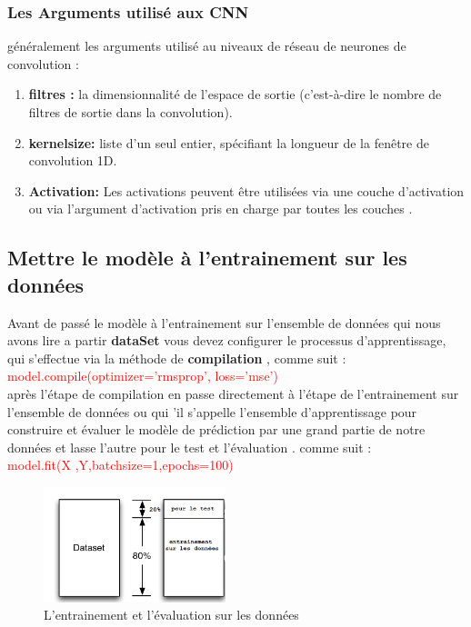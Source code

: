 \documentclass[12pt]{report}
\begin{document}
\subsubsection{Les Arguments utilisé aux CNN}
généralement les arguments utilisé au niveaux de réseau de neurones de convolution :
\begin{enumerate}
\item \textbf{filtres :} la dimensionnalité de l'espace de sortie (c'est-à-dire le nombre de filtres de sortie dans la convolution).
\item \textbf{kernelsize:} liste d'un seul entier, spécifiant la longueur de la fenêtre de convolution 1D.
\item \textbf{Activation:} Les activations peuvent être utilisées via une couche d'activation ou via l'argument d'activation pris en charge par toutes les couches .
\end{enumerate}

\subsection{Mettre le modèle à l'entrainement sur les données}
Avant de passé le modèle à l'entrainement sur l'ensemble de données qui nous avons lire a partir \textbf{dataSet} vous devez configurer le processus d'apprentissage, qui s'effectue via la méthode de \textbf{compilation} \cite{ref31} , comme suit :\\
\textcolor{red}{model.compile(optimizer='rmsprop', loss='mse')} \cite{ref31}\\
après l'étape de compilation en passe directement à l'étape de l'entrainement sur l'ensemble de données ou qui 'il s'appelle l'ensemble d'apprentissage pour construire et évaluer le modèle de prédiction par une grand partie de notre données et lasse l'autre pour le test et l'évaluation \cite{ref25}. comme suit :\\
\textcolor{red}{model.fit(X ,Y,batchsize=1,epochs=100)} \cite{ref31}
\begin{figure}[h]
\begin{center}
\includegraphics[width=200]{evalu2.png}
\caption{L'entrainement et l'évaluation sur les données}
\end{center}
\end{figure}
\end{document}
